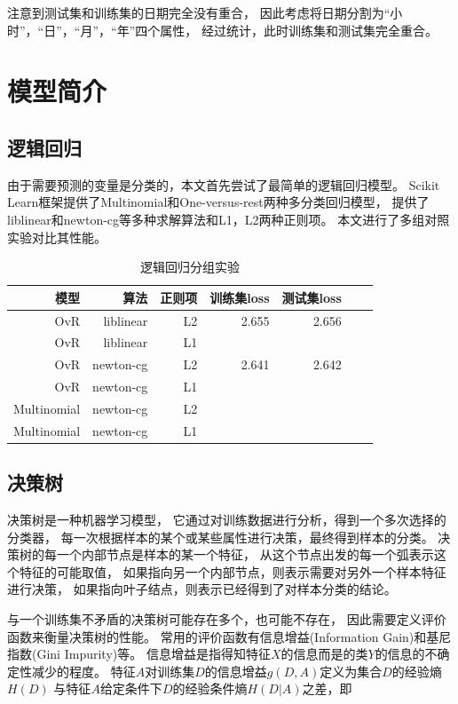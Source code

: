 \documentclass[a4paper, twocolumn]{article}
\begin{document}
注意到测试集和训练集的日期完全没有重合，
因此考虑将日期分割为“小时”，“日”，“月”，“年”四个属性，
经过统计，此时训练集和测试集完全重合。

\section{模型简介}

\subsection{逻辑回归}

由于需要预测的变量是分类的，本文首先尝试了最简单的逻辑回归模型。
Scikit Learn框架提供了Multinomial和One-versus-rest两种多分类回归模型，
提供了liblinear和newton-cg等多种求解算法和L1，L2两种正则项。
本文进行了多组对照实验对比其性能。

\begin{table}[h]
    \centering
    \begin{tabular}{*{7}{r}}
        \hline
        模型& 算法& 正则项& 训练集loss& 测试集loss \\
        \hline
        OvR& liblinear& L2& 2.655& 2.656& \\
        OvR& liblinear& L1& & & \\
        OvR& newton-cg& L2& 2.641& 2.642& \\
        OvR& newton-cg& L1& & & \\
        Multinomial& newton-cg& L2& & & \\
        Multinomial& newton-cg& L1& & & \\
        \hline
    \end{tabular}
    \caption{逻辑回归分组实验}
    \label{tab:logsitic}
\end{table}

\subsection{决策树}

决策树是一种机器学习模型，
它通过对训练数据进行分析，得到一个多次选择的分类器，
每一次根据样本的某个或某些属性进行决策，最终得到样本的分类。
决策树的每一个内部节点是样本的某一个特征，
从这个节点出发的每一个弧表示这个特征的可能取值，
如果指向另一个内部节点，则表示需要对另外一个样本特征进行决策，
如果指向叶子结点，则表示已经得到了对样本分类的结论。

与一个训练集不矛盾的决策树可能存在多个，也可能不存在，
因此需要定义评价函数来衡量决策树的性能。
常用的评价函数有信息增益(Information Gain)和基尼指数(Gini Impurity)等。
信息增益是指得知特征$X$的信息而是的类$Y$的信息的不确定性减少的程度。
特征$A$对训练集$D$的信息增益$g(D, A)$定义为集合$D$的经验熵$H(D)$
与特征$A$给定条件下$D$的经验条件熵$H(D|A)$之差，即
\end{document}
